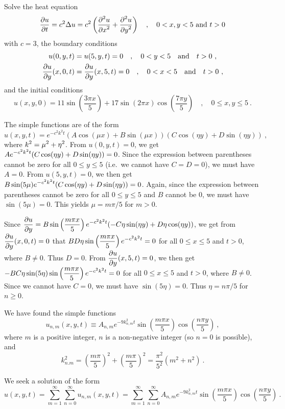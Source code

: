 \begin{egg}
Solve the heat equation
\[
\frac{\partial{u}}{\partial t} = c^2 \Delta u = c^2 \left( \frac{\displaystyle \partial^{2}{u}} {\displaystyle \partial x^{2}} +
\frac{\displaystyle \partial^{2}{u}} {\displaystyle \partial y^{2}} \right) \quad ,
\quad 0<x , y<5 \ \text{and} \ t>0
\]
with $c=3$, the boundary conditions
\begin{align*}
u(0,y,t) &= u(5,y,t) = 0 \quad , \quad 0<y<5 \quad \text{and}
\quad t>0 \ , \\
\frac{\partial{u}}{\partial y}(x,0,t) &= \frac{\partial{u}}{\partial y}(x,5,t) = 0 \quad , \quad
0<x<5 \quad \text{and} \quad t>0 \ ,
\end{align*}
and the initial conditions
\[
u(x,y,0) = 11 \sin\left(\frac{3\pi x}{5}\right) + 17 \sin\left(2\pi x\right)
\cos\left(\frac{7\pi y }{5}\right) \quad , \quad
0\leq x, y \leq 5 \ .
\]

The simple functions are of the form
\[
u(x,y,t) = e^{-c^2 k^2 t}(A \cos (\mu x) + B \sin (\mu x))
(C \cos (\eta y) + D \sin (\eta y)) \ ,
\]
where $\displaystyle k^2 = \mu^2 + \eta^2$.
From $u(0,y,t) = 0$, we get
$\displaystyle A e^{-c^2 k^2 t} (C \cos (\eta y) + D \sin (\eta y)) = 0$.
Since the expression between parentheses cannot be zero
for all $0 \leq y \leq 5$ (i.e.\ we cannot have $C=D=0$), we must have
$A=0$.  From $u(5,y,t) = 0$, we then get
$\displaystyle
B \sin(5\mu) e^{-c^2 k^2 t} (C \cos (\eta y) + D \sin (\eta y)) =0$.
Again, since the expression between parentheses cannot be zero for all
$0 \leq y \leq 5$ and $B$ cannot be $0$, we must have $\sin(5\mu) = 0$.  This
yields $\mu = m\pi/5$ for $m >0$.

Since 
$\displaystyle \frac{\partial{u}}{\partial y} = B \sin\left(\frac{m\pi x}{5}\right) e^{-c^2 k^2 t}
(-C \eta \sin (\eta y) + D \eta \cos (\eta y))$,
we get from $\displaystyle \frac{\partial{u}}{\partial y}(x,0,t) = 0$ that
$\displaystyle B D \eta \sin\left(\frac{m\pi x}{5}\right) e^{-c^2 k^2 t} = 0$
for all $0 \leq x \leq 5$ and $t>0$, where $B\neq 0$.  Thus $D=0$.  From
$\displaystyle \frac{\partial{u}}{\partial y}(x,5,t) = 0$, we then get
$\displaystyle
-B C \eta \sin(5\eta)\sin\left(\frac{m\pi x}{5}\right) e^{-c^2 k^2 t} = 0$
for all $0 \leq x \leq 5$ and $t>0$, where $B\neq 0$.  Since we cannot have
$C=0$, we must have $\sin(5\eta) = 0$.  Thus $\eta = n \pi/5$ for
$n \geq 0$.

We have found the simple functions
\[
u_{n,m}(x,y,t) \equiv A_{n,m} e^{-9 k_{n,m}^2 t} \sin\left(\frac{m\pi x}{5}\right)
\cos\left(\frac{n\pi y}{5}\right) \ ,
\]
where $m$ is a positive integer, $n$ is a non-negative integer (so
$n=0$ is possible), and
\[
k_{n.m}^2 = \left(\frac{m \pi}{5}\right)^2 + \left(\frac{m \pi}{5}\right)^2
= \frac{\pi^2}{5^2} \left(m^2+n^2\right) \ .
\]

We seek a solution of the form
\[
u(x,y,t) = \sum_{m=1}^\infty \sum_{n=0}^\infty u_{n,m}(x,y,t)
= \sum_{m=1}^\infty \sum_{n=0}^\infty
A_{n,m} e^{-9 k_{n,m}^2 t} \sin\left(\frac{m\pi x}{5}\right)
\cos\left(\frac{n\pi y}{5}\right) \ .
\]


\end{egg}
